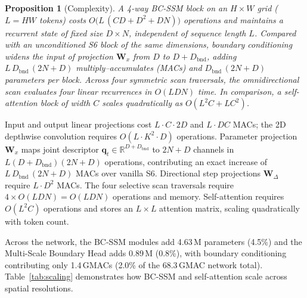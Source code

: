 \documentclass[journal]{IEEEtran}
\newtheorem{proposition}{Proposition}
\newcommand{\R}{\mathbb{R}}
\newcommand{\vect}[1]{\bm{#1}}
\newcommand{\Dt}{\Delta}
\newcommand{\BCparams}{4.63}      %
\newcommand{\BCmacs}{1.4}         %
\begin{document}
\begin{proposition}[Complexity]
\label{prop:complexity}
A 4-way BC-SSM block on an $H\times W$ grid ($L=HW$ tokens) costs $O\big(L\,(CD + D^{2} + DN)\big)$ operations and maintains a recurrent state of fixed size $D\times N$, independent of sequence length $L$. Compared with an unconditioned S6 block of the same dimensions, boundary conditioning widens the input of projection $\vect{W}_x$ from $D$ to $D+D_{\text{bnd}}$, adding $L\,D_{\text{bnd}}\,(2N+D)$ multiply--accumulates (MACs) and $D_{\text{bnd}}\,(2N+D)$ parameters per block. Across four symmetric scan traversals, the omnidirectional scan evaluates four linear recurrences in $O(LDN)$ time. In comparison, a self-attention block of width $C$ scales quadratically as $O(L^{2}C + LC^{2})$.
\end{proposition}
\begin{IEEEproof}
Input and output linear projections cost $L\cdot C\cdot 2D$ and $L\cdot DC$ MACs; the 2D depthwise convolution requires $O(L\cdot K^2\cdot D)$ operations. Parameter projection $\vect{W}_x$ maps joint descriptor $\vect{q}_t\in\R^{D+D_{\text{bnd}}}$ to $2N+D$ channels in $L(D+D_{\text{bnd}})(2N+D)$ operations, contributing an exact increase of $L\,D_{\text{bnd}}\,(2N+D)$ MACs over vanilla S6. Directional step projections $\vect{W}_\Dt$ require $L\cdot D^2$ MACs. The four selective scan traversals require $4\times O(LDN)=O(LDN)$ operations and memory. Self-attention requires $O(L^2C)$ operations and stores an $L\times L$ attention matrix, scaling quadratically with token count.
\end{IEEEproof}
Across the network, the BC-SSM modules add \BCparams\,M parameters (4.5\%) and the Multi-Scale Boundary Head adds 0.89\,M (0.8\%), with boundary conditioning contributing only \BCmacs\,GMACs (2.0\% of the 68.3\,GMAC network total). Table~\ref{tab:scaling} demonstrates how BC-SSM and self-attention scale across spatial resolutions.
\end{document}
